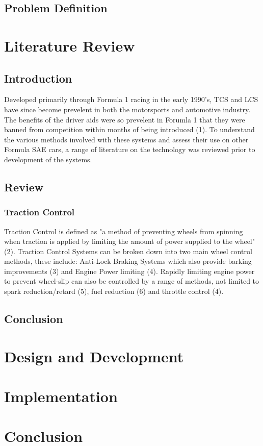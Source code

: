 \subsection{Problem Definition}

\section{Literature Review}
\subsection{Introduction}
Developed primarily through Formula 1 racing in the early 1990's, TCS and LCS have since become prevelent in both the motorsports and automotive industry. The benefits of the driver aids were so prevelent in Forumla 1 that they were banned from competition within months of being introduced (1). To understand the various methods involved with these systems and assess their use on other Formula SAE cars, a range of literature on the technology was reviewed prior to development of the systems.
 
\subsection{Review}
\subsubsection{Traction Control}
Traction Control is defined as "a method of preventing wheels from spinning when traction is applied by limiting the amount of power supplied to the wheel" (2). Traction Control Systems can be broken down into two main wheel control methods, these include: Anti-Lock Braking Systems which also provide barking improvements (3) and Engine Power limiting (4). Rapidly limiting engine power to prevent wheel-slip can also be controlled by a range of methods, not limited to spark reduction/retard (5), fuel reduction (6) and throttle control (4).

\subsection{Conclusion}

\section{Design and Development}

\section{Implementation}


\section{Conclusion}
